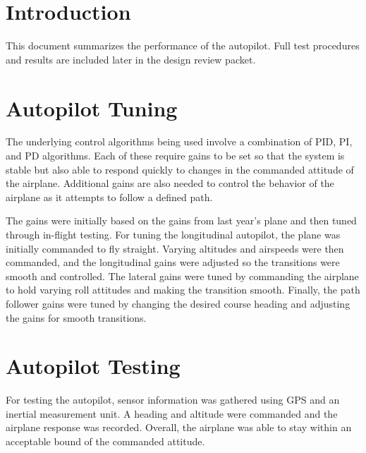 \documentclass[]{auvsi_doc}
\begin{document}
\begin{AUVSITitlePage}
\begin{artifacttable}
\end{artifacttable}
\end{AUVSITitlePage}


\section{Introduction}
This document summarizes the performance of the autopilot. Full test procedures and results are included later in the design review packet.

\section{Autopilot Tuning}

The underlying control algorithms being used involve a combination of PID, PI, and PD algorithms. Each of these require gains to be set so that the system is stable but also able to respond quickly to changes in the commanded attitude of the airplane. Additional gains are also needed to control the behavior of the airplane as it attempts to follow a defined path.


The gains were initially based on the gains from last year's plane and then tuned through in-flight testing. For tuning the longitudinal autopilot, the plane was initially commanded to fly straight. Varying altitudes and airspeeds were then commanded, and the longitudinal gains were adjusted so the transitions were smooth and controlled. The lateral gains were tuned by commanding the airplane to hold varying roll attitudes and making the transition smooth. Finally, the path follower gains were tuned by changing the desired course heading and adjusting the gains for smooth transitions.

\section{Autopilot Testing}

For testing the autopilot, sensor information was gathered using GPS and an inertial measurement unit. A heading and altitude were commanded and the airplane response was recorded. Overall, the airplane was able to stay within an acceptable bound of the commanded attitude. 
\end{document}
